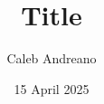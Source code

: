 \documentclass[11pt]{article}
\begin{document}
\begin{titlepage}
  \title{Title}
  \author{Caleb Andreano}
  \date{15 April 2025}
  \maketitle
  \thispagestyle{empty} %
\end{titlepage}
\clearpage
\setcounter{page}{1}

\pagebreak
\printbibliography
\end{document}
